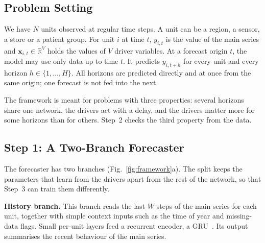 \documentclass[conference]{IEEEtran}
\begin{document}
\subsection{Problem Setting}

We have $N$ units observed at regular time steps. A unit can be a region, a sensor, a store or a patient group. For unit $i$ at time $t$, $y_{i,t}$ is the value of the main series and $\mathbf{x}_{i,t}\in\mathbb{R}^{V}$ holds the values of $V$ driver variables. At a forecast origin $t$, the model may use only data up to time $t$. It predicts $y_{i,t+h}$ for every unit and every horizon $h \in \{1,\dots,H\}$. All horizons are predicted directly and at once from the same origin; one forecast is not fed into the next.

The framework is meant for problems with three properties: several horizons share one network, the drivers act with a delay, and the drivers matter more for some horizons than for others. Step~2 checks the third property from the data.

\subsection{Step 1: A Two-Branch Forecaster}

The forecaster has two branches (Fig.~\ref{fig:framework}a). The split keeps the parameters that learn from the drivers apart from the rest of the network, so that Step~3 can train them differently.

\textbf{History branch.} This branch reads the last $W$ steps of the main series for each unit, together with simple context inputs such as the time of year and missing-data flags. Small per-unit layers feed a recurrent encoder, a GRU~\cite{cho2014gru}. Its output summarises the recent behaviour of the main series.
\end{document}

